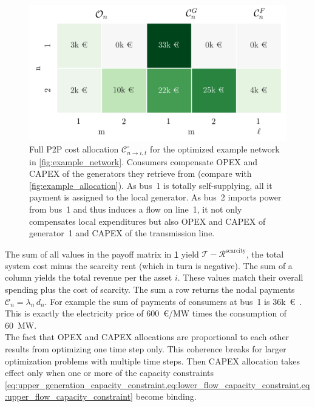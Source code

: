 \documentclass[11pt,twocolumn]{article}
\newcommand{\kk}{k~\euro~}
\newcommand{\totalcost}{\mathcal{T}}
\newcommand{\cost}[1][\circ]{\mathcal{C}^{#1}}
\newcommand{\remainingcost}{\mathcal{R}}
\newcommand{\scarcitycost}{\remainingcost^\text{scarcity}}
\newcommand{\allocatecost}[1][n \rightarrow i]{\cost_{#1, t}}
\begin{document}
\begin{figure}[h]
    \centering
    \includegraphics[width=\linewidth]{example_payoff_net_ptpf.png}
    \caption{Full P2P cost allocation $\allocatecost$ for the optimized example network in \cref{fig:example_network}. Consumers compensate OPEX and CAPEX of the generators they retrieve from (compare with \cref{fig:example_allocation}). As bus~1 is totally self-supplying, all it payment is assigned to the local generator.  As bus~2 imports power from bus~1 and thus induces a flow on line~1, it not only compensates local expenditures but also OPEX and CAPEX of generator~1 and CAPEX of the transmission line.}
    \label{fig:example_payoff}
\end{figure}    

The sum of all values in the payoff matrix in \cref{fig:example_payoff} yield $\totalcost - \scarcitycost$, the total system cost minus the scarcity rent (which in turn is negative).
The sum of a column  yields the total revenue per the asset $i$. These values match their overall spending plus the cost of scarcity. The sum a row returns the nodal payments $\mathcal{C}_n = \lambda_n \, d_n$. For example the sum of payments of consumers at bus~1 is 36\kk. This is exactly the electricity price of 600~\euro/MW times the consumption of 60~MW. \\
% 

The fact that OPEX and CAPEX allocations are proportional to each other results from optimizing one time step only. This coherence breaks for larger optimization problems with multiple time steps. Then CAPEX allocation takes effect only when one or more of the capacity constraints  \cref{eq:upper_generation_capacity_constraint,eq:lower_flow_capacity_constraint,eq:upper_flow_capacity_constraint} become binding.  \\
\end{document}
